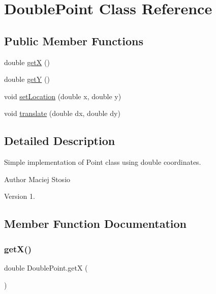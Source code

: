 \hypertarget{class_double_point}{}\section{Double\+Point Class Reference}
\label{class_double_point}
\subsection*{Public Member Functions}
\begin{DoxyCompactItemize}
\item 
double \hyperlink{class_double_point_ac077fc9eadd03e6f7caeec37265b4d08}{getX} ()
\item 
double \hyperlink{class_double_point_a23bfa07d4c1af558eb85ec06155e2740}{getY} ()
\item 
void \hyperlink{class_double_point_abf7ded4d23fddd292e089f02dae94566}{set\+Location} (double x, double y)
\item 
void \hyperlink{class_double_point_a3f02b79ca4952156c087404cf85aee7d}{translate} (double dx, double dy)
\end{DoxyCompactItemize}


\subsection{Detailed Description}
Simple implementation of Point class using double coordinates. \begin{DoxyAuthor}{Author}
Maciej Stosio 
\end{DoxyAuthor}
\begin{DoxyVersion}{Version}
1. 
\end{DoxyVersion}


\subsection{Member Function Documentation}
\mbox{\label{class_double_point_ac077fc9eadd03e6f7caeec37265b4d08}} 
\subsubsection{\texorpdfstring{get\+X()}{getX()}}
{\footnotesize\ttfamily double Double\+Point.\+getX (\begin{DoxyParamCaption}{ }\end{DoxyParamCaption})}

